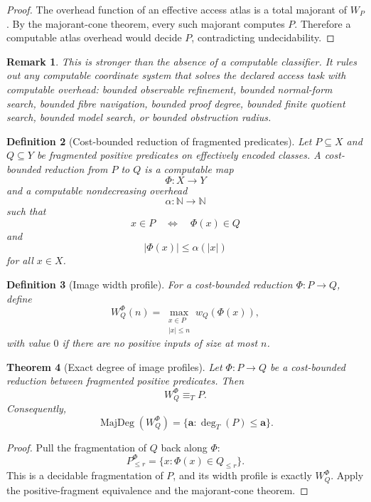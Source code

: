 \documentclass[11pt]{article}
\newtheorem{theorem}{Theorem}[section]
\newtheorem{definition}[theorem]{Definition}
\newtheorem{remark}[theorem]{Remark}
\begin{document}
\begin{proof}
The overhead function of an effective access atlas is a total majorant of \(W_P\). By the majorant-cone theorem, every such majorant computes \(P\). Therefore a computable atlas overhead would decide \(P\), contradicting undecidability.
\end{proof}

\begin{remark}
This is stronger than the absence of a computable classifier. It rules out any computable coordinate system that solves the declared access task with computable overhead: bounded observable refinement, bounded normal-form search, bounded fibre navigation, bounded proof degree, bounded finite quotient search, bounded model search, or bounded obstruction radius.
\end{remark}

\begin{definition}[Cost-bounded reduction of fragmented predicates]
Let \(P\subseteq X\) and \(Q\subseteq Y\) be fragmented positive predicates on effectively encoded classes. A cost-bounded reduction from \(P\) to \(Q\) is a computable map
\[
\Phi:X\to Y
\]
and a computable nondecreasing overhead
\[
\alpha:\mathbb N\to\mathbb N
\]
such that
\[
x\in P
\quad\Longleftrightarrow\quad
\Phi(x)\in Q
\]
and
\[
|\Phi(x)|\le \alpha(|x|)
\]
for all \(x\in X\).
\end{definition}

\begin{definition}[Image width profile]
For a cost-bounded reduction \(\Phi:P\to Q\), define
\[
W_Q^\Phi(n)
=
\max_{\substack{x\in P\\ |x|\le n}}
w_Q(\Phi(x)),
\]
with value \(0\) if there are no positive inputs of size at most \(n\).
\end{definition}

\begin{theorem}[Exact degree of image profiles]
Let \(\Phi:P\to Q\) be a cost-bounded reduction between fragmented positive predicates. Then
\[
W_Q^\Phi\equiv_T P.
\]
Consequently,
\[
\operatorname{MajDeg}(W_Q^\Phi)
=
\{\mathbf a:\deg_T(P)\le \mathbf a\}.
\]
\end{theorem}

\begin{proof}
Pull the fragmentation of \(Q\) back along \(\Phi\):
\[
P_{\le r}^{\Phi}=\{x:\Phi(x)\in Q_{\le r}\}.
\]
This is a decidable fragmentation of \(P\), and its width profile is exactly \(W_Q^\Phi\). Apply the positive-fragment equivalence and the majorant-cone theorem.
\end{proof}
\end{document}
